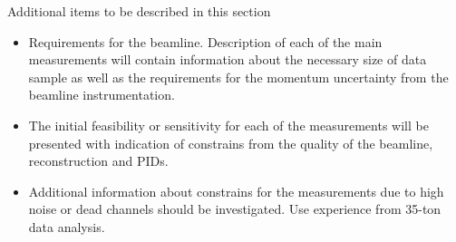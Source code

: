 Additional items to be described in this section
\begin{itemize}
\item Requirements for the beamline. Description of  each of the main measurements will contain  information about the necessary size of data sample as well as the requirements  for the momentum uncertainty from the beamline instrumentation. 
\item The initial feasibility or sensitivity  for each of the measurements will be presented with indication of constrains from the quality of the beamline, reconstruction and PIDs. 
\item Additional information about constrains for the measurements due to high noise or dead channels should be investigated. Use experience from 35-ton data analysis. 
\end{itemize}


